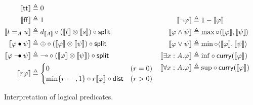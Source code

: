 \documentclass[a4paper,UKenglish,cleveref, autoref, thm-restate]{lipics-v2021}
\newcommand{\lol}{\mathbin{\multimap}}
\newcommand{\mprod}{\otimes}
\newcommand{\splt}{\mathsf{split}}
\newcommand{\distribute}{\mathsf{dist}}
\newcommand{\tuple}[1]{\langle #1 \rangle}
\newcommand{\true}{\mathsf{tt}}
\newcommand{\false}{\mathsf{ff}}
\newcommand{\ltensor}{*}
\renewcommand{\ltensor}{\bullet}
\newcommand{\lexp}{\mathbin{{-}\kern-.2em\raisebox{0ex}{$*$}}}
\renewcommand{\lexp}{\mathbin{{-}\kern-.2em\raisebox{0ex}{$\bullet$}}}
\newcommand{\curry}{\mathsf{curry}}
\newcommand{\peq}{=}
\newcommand{\defeq}{\triangleq}
\newcommand{\den}[1]{\llbracket #1\rrbracket}
\begin{document}
\begin{figure}[t]
\begin{align*}
\begin{aligned}
\den\true &\defeq 0 \\
\den\false &\defeq 1 \\
\den{t \peq_A u}
    &\defeq d_{\den A}\circ (\den{t} \mprod \den{s}) \circ \splt \\
\den{\varphi \ltensor \psi} 
    &\defeq \oplus \circ (\den{\varphi} \mprod \den{\psi}) \circ \splt \\
\den{\varphi \lexp \psi} 
    &\defeq \lol \circ (\den{\varphi} \mprod \den{\psi}) \circ \splt \\
\den{r\varphi} 
    &\defeq \begin{cases}
    0 & (r=0) \\
    {\min} \{r \cdot -, 1\} \circ r\den{\varphi}\circ \distribute 
    & (r > 0)
    \end{cases}
\end{aligned}
&&
\begin{aligned}
\den{\neg\varphi} 
    &\defeq 1-\den{\varphi} \\
\den{\varphi \wedge \psi}
    &\defeq \max \circ \tuple{\den{\varphi},\den{\psi}} \\
\den{\varphi \vee \psi} 
    &\defeq \min \circ \tuple{\den{\varphi},\den{\psi}} \\
\den{\exists x: A. \varphi} 
    &\defeq {\inf} \circ \curry(\den{\varphi}) \\
\den{\forall x: A. \varphi} 
    &\defeq {\sup} \circ \curry(\den{\varphi})
\end{aligned}
\end{align*}
    \caption{Interpretation of logical predicates.}
    \label{fig:predicates:interp}
\end{figure}
\end{document}
